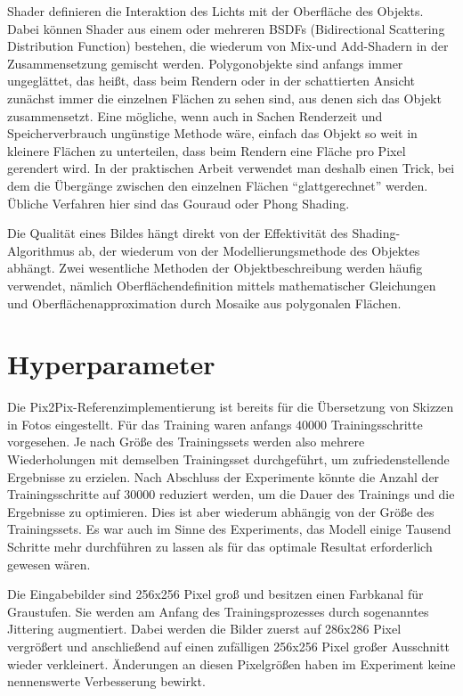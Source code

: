 Shader definieren die Interaktion des Lichts mit der Oberfläche des Objekts. Dabei können Shader aus einem oder mehreren BSDFs (Bidirectional Scattering Distribution Function) bestehen, die wiederum von Mix-und Add-Shadern in der Zusammensetzung gemischt werden. Polygonobjekte sind anfangs immer ungeglättet, das heißt, dass beim Rendern oder in der schattierten Ansicht zunächst immer die einzelnen Flächen zu sehen sind, aus denen sich das Objekt zusammensetzt. Eine mögliche, wenn auch in Sachen Renderzeit und Speicherverbrauch ungünstige Methode wäre, einfach das Objekt so weit in kleinere Flächen zu unterteilen, dass beim Rendern eine Fläche pro Pixel gerendert wird. In der praktischen Arbeit verwendet man deshalb einen Trick, bei dem die Übergänge zwischen den einzelnen Flächen ``glattgerechnet'' werden. Übliche Verfahren hier sind das Gouraud oder Phong Shading. \cite{wartmann2014blender}

Die Qualität eines Bildes hängt direkt von der Effektivität des Shading-Algorithmus ab, der wiederum von der Modellierungsmethode des Objektes abhängt. Zwei wesentliche Methoden der Objektbeschreibung werden häufig verwendet, nämlich Oberflächendefinition mittels mathematischer Gleichungen und Oberflächenapproximation durch Mosaike aus polygonalen Flächen. \cite{phong1975shading}


\section{Hyperparameter}
\label{sec:hyperparams}
Die Pix2Pix-Referenzimplementierung ist bereits für die Übersetzung von Skizzen in Fotos eingestellt. Für das Training waren anfangs $40000$ Trainingsschritte vorgesehen. Je nach Größe des Trainingssets werden also mehrere Wiederholungen mit demselben Trainingsset durchgeführt, um zufriedenstellende Ergebnisse zu erzielen. Nach Abschluss der Experimente könnte die Anzahl der Trainingsschritte auf $30000$ reduziert werden, um die Dauer des Trainings und die Ergebnisse zu optimieren. Dies ist aber wiederum abhängig von der Größe des Trainingssets. Es war auch im Sinne des Experiments, das Modell einige Tausend Schritte mehr durchführen zu lassen als für das optimale Resultat erforderlich gewesen wären.

Die Eingabebilder sind 256x256 Pixel groß und besitzen einen Farbkanal für Graustufen. Sie werden am Anfang des Trainingsprozesses durch sogenanntes Jittering augmentiert. Dabei werden die Bilder zuerst auf 286x286 Pixel vergrößert und anschließend auf einen zufälligen 256x256 Pixel großer Ausschnitt wieder verkleinert. Änderungen an diesen Pixelgrößen haben im Experiment keine nennenswerte Verbesserung bewirkt.

